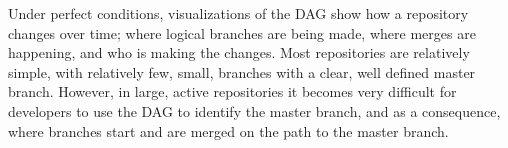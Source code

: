 Under perfect conditions, visualizations of the DAG show how a
repository changes over time; where logical branches are being made,
where merges are happening, and who is making the changes. Most
repositories are relatively simple, with relatively few, small, branches
with a clear, well defined master branch. However, in large, active
repositories it becomes very difficult for developers to use the DAG to
identify the master branch, and as a consequence, where branches start
and are merged on the path to the master branch. 

